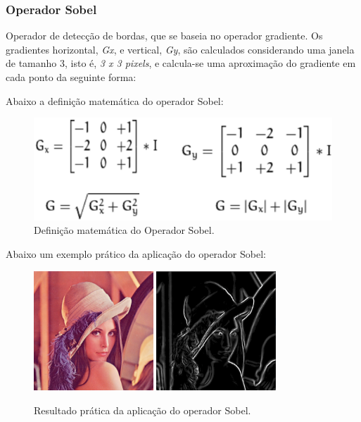 \subsubsection{Operador Sobel}
Operador de detecção de bordas, que se baseia no operador gradiente.
Os gradientes horizontal, \textit{Gx}, e vertical, \textit{Gy}, são calculados considerando uma janela de tamanho 3, isto é, \textit{3 x 3 pixels}, e calcula-se uma aproximação do gradiente em cada ponto da seguinte forma: \citep{sobel}

Abaixo a definição matemática do operador Sobel:
	\begin{figure}[!htb]
       \begin{center}  
          \includegraphics[width=0.7\columnwidth]{img/definicao_matematica_sobel.jpg}
           \caption{\label{fig:definicao_matematica_sobel}Definição matemática do Operador Sobel.}
       \end{center}
   \end{figure} 
   
Abaixo um exemplo prático da aplicação do operador Sobel:   
\begin{figure}[!htb]
 \centering
 \def\baselinestretch{1}\small\normalsize
 \includegraphics[width=0.4\textwidth]{img/lena_original.png}\qquad
 \includegraphics[width=0.4\textwidth]{img/lena_sobel.png} 
 \caption{\label{fig:lena_sobel}Resultado prática da aplicação do operador Sobel.}
\end{figure} 
\clearpage

